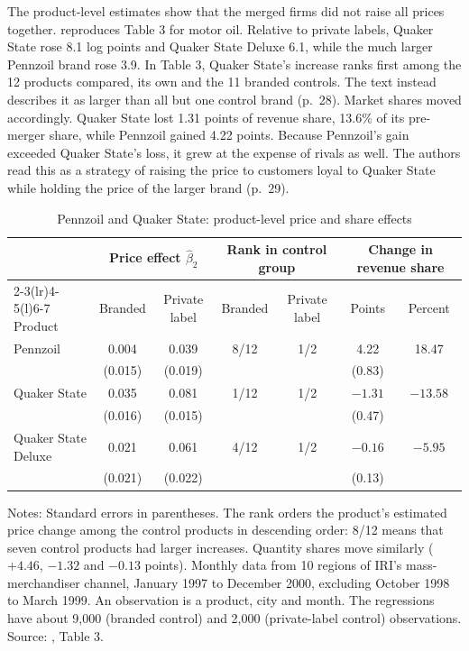 The product-level estimates show that the merged firms did not raise all prices together. 
reproduces Table 3 for motor oil. Relative to private labels, Quaker State rose 8.1 log points and Quaker State
Deluxe 6.1, while the much larger Pennzoil brand rose 3.9. In Table 3, Quaker State's increase ranks first among
the 12 products compared, its own and the 11 branded controls. The text instead describes it as larger than all but
one control brand (p.~28). Market shares moved accordingly. Quaker State lost 1.31 points of revenue share, 13.6\%
of its pre-merger share, while Pennzoil gained 4.22 points. Because Pennzoil's gain exceeded Quaker State's loss,
it grew at the expense of rivals as well. The authors read this as a strategy of raising the price to customers
loyal to Quaker State while holding the price of the larger brand (p.~29).

\begin{table}[htbp]
\centering
\caption{Pennzoil and Quaker State: product-level price and share effects}
\label{tab:11-ah-pqs}
\footnotesize
\begin{tabular}{@{}lcccccc@{}}
\toprule
& \multicolumn{2}{c}{Price effect $\hat\beta_2$} & \multicolumn{2}{c}{Rank in control group} &
\multicolumn{2}{c}{Change in revenue share} \\
\cmidrule(lr){2-3}\cmidrule(lr){4-5}\cmidrule(l){6-7}
Product & Branded & Private label & Branded & Private label & Points & Percent \\
\midrule
Pennzoil & 0.004 & 0.039 & 8/12 & 1/2 & 4.22 & 18.47 \\
 & (0.015) & (0.019) & & & (0.83) & \\
Quaker State & 0.035 & 0.081 & 1/12 & 1/2 & $-1.31$ & $-13.58$ \\
 & (0.016) & (0.015) & & & (0.47) & \\
Quaker State Deluxe & 0.021 & 0.061 & 4/12 & 1/2 & $-0.16$ & $-5.95$ \\
 & (0.021) & (0.022) & & & (0.13) & \\
\bottomrule
\end{tabular}

\smallskip
\begin{minipage}{0.95\linewidth}
\footnotesize Notes: Standard errors in parentheses. The rank orders the product's estimated price change among
the control products in descending order: 8/12 means that seven control products had larger increases. Quantity
shares move similarly ($+4.46$, $-1.32$ and $-0.13$ points). Monthly data from 10 regions of IRI's
mass-merchandiser channel, January 1997 to December 2000, excluding October 1998 to March 1999. An observation is
a product, city and month. The regressions have about 9,000 (branded control) and 2,000 (private-label control)
observations. Source: \citet{AshenfelterHosken2008}, Table 3.
\end{minipage}
\end{table}

